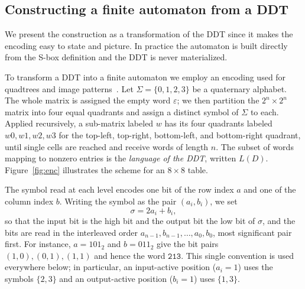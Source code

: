 \documentclass[runningheads]{llncs}
\newcommand{\Sig}{\Sigma}
\newcommand{\re}[1]{\texttt{#1}}
\begin{document}
\subsection{Constructing a finite automaton from a DDT}

We present the construction as a transformation of the DDT since it makes the encoding easy to state and picture. In practice the automaton is built directly from the S-box definition and the DDT is never materialized.

To transform a DDT into a finite automaton we employ an encoding used for
quadtrees and image patterns~\cite{BerstelAndNaitAbdallah,BerstelAndMorcrette}. Let $\Sig=\{0,1,2,3\}$ be a
quaternary alphabet. The whole matrix is assigned the empty word $\varepsilon$; we
then partition the $2^{n}\times 2^{n}$ matrix into four equal quadrants and assign
a distinct symbol of $\Sig$ to each. Applied recursively, a sub-matrix labeled
$w$ has its four quadrants labeled $w0,w1,w2,w3$ for the top-left, top-right,
bottom-left, and bottom-right quadrant, until single cells are reached and receive
words of length $n$. The subset of words mapping to nonzero entries is the
\emph{language of the DDT}, written $L(D)$. Figure~\ref{fig:enc} illustrates the
scheme for an $8\times 8$ table.

The symbol read at each level encodes one bit of the row index $a$ and one of the
column index $b$. Writing the symbol as the pair $(a_i,b_i)$, we set
\begin{equation}\label{eq:enc}
  \sigma = 2a_i + b_i,
\end{equation}
so that the input bit is the high bit and the output bit the low bit of $\sigma$,
and the bits are read in the interleaved order $a_{n-1},b_{n-1},\dots,a_0,b_0$,
most significant pair first. For instance, $a=101_2$ and $b=011_2$ give the bit
pairs $(1,0),(0,1),(1,1)$ and hence the word $\re{213}$. This single convention is
used everywhere below; in particular, an input-active position ($a_i=1$) uses the
symbols $\{2,3\}$ and an output-active position ($b_i=1$) uses $\{1,3\}$.
\end{document}
